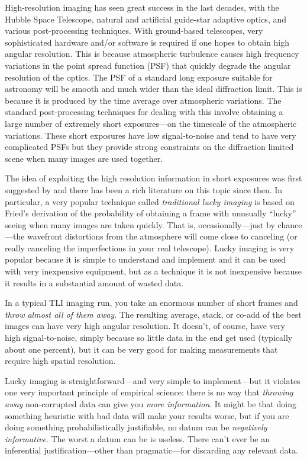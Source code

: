 \documentclass[12pt,preprint]{aastex}
\newcommand{\project}[1]{{\sffamily #1}}
\begin{document}
High-resolution imaging has seen great success in the last decades,
with the \project{Hubble Space Telescope}, natural and artificial
guide-star adaptive optics, and various post-processing techniques.
With ground-based telescopes, very sophisticated hardware and/or
software is required if one hopes to obtain high angular resolution.
This is because atmospheric turbulence causes high frequency variations
in the point spread function (PSF) that quickly degrade the angular
resolution of the optics. The PSF of a standard long exposure suitable
for astronomy will be smooth and much wider than the ideal diffraction
limit. This is because it is produced by the time average over
atmospheric variations. The standard post-processing techniques for
dealing with this involve obtaining a large number of extremely short
exposures---on the timescale of the atmospheric variations. These
short exposures have low signal-to-noise and tend to have very
complicated PSFs but they provide strong constraints on the
diffraction limited scene when many images are used together.

The idea of exploiting the high resolution information in short
exposures was first suggested by \citet{labeyrie} and there has
been a rich literature on this topic since then. In particular,
a very popular technique called \emph{traditional lucky imaging}
\citep[TLI;][]{law} is based on Fried's derivation of the probability
of obtaining a
frame with unusually ``lucky'' seeing when many images are taken
quickly. That is, occasionally---just by chance---the wavefront
distortions from the atmosphere will come close to canceling (or
really canceling the imperfections in your real telescope).
Lucky imaging is very popular because it is simple to understand and
implement and it can be used with very inexpensive equipment, but as a
technique it is not inexpensive because it results in a substantial
amount of wasted data.

In a typical TLI imaging run, you take an enormous number
of short frames and \emph{throw almost all of them away}.  The
resulting average, stack, or co-add of the best images can have very
high angular resolution.  It doesn't, of course, have very high
signal-to-noise, simply because so little data in the end get used
(typically about one percent), but it can be very good for making
measurements that require high spatial resolution.

Lucky imaging is straightforward---and very simple to implement---but
it violates one very important principle of empirical science: there
is no way that \emph{throwing away} non-corrupted data can give you
\emph{more information}.  It might be that doing something heuristic
with bad data will make your results worse, but if you are doing
something probabilistically justifiable, no datum can be
\emph{negatively informative}.  The worst a datum can be is useless.
There can't ever be an inferential justification---other than
pragmatic---for discarding any relevant data.
\end{document}
